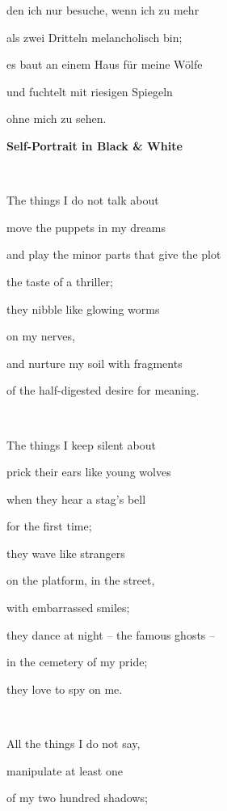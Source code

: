 den ich nur besuche, wenn ich zu mehr 

als zwei Dritteln melancholisch bin;

es baut an einem Haus für meine Wölfe \ 

und fuchtelt mit riesigen Spiegeln

ohne mich zu sehen.


\bigskip


\bigskip


\bigskip


\bigskip


\bigskip


\bigskip


\bigskip


\bigskip


\bigskip


\bigskip


\bigskip

{\bfseries
Self-Portrait in Black \& White}

~

The things I do not talk about

move the puppets in my dreams

and play the minor parts that give the plot 

the taste of a thriller;

they nibble like glowing worms

on my nerves,

and nurture my soil with fragments

of the half-digested desire for meaning.

~

The things I keep silent about

prick their ears like young wolves

when they hear a stag's bell

for the first time;

they wave like strangers

on the platform, in the street,

with embarrassed smiles;

they dance at night -- the famous ghosts -- 

in the cemetery of my pride;

they love to spy on me.

~

All the things I do not say,

manipulate at least one

of my two hundred shadows;

